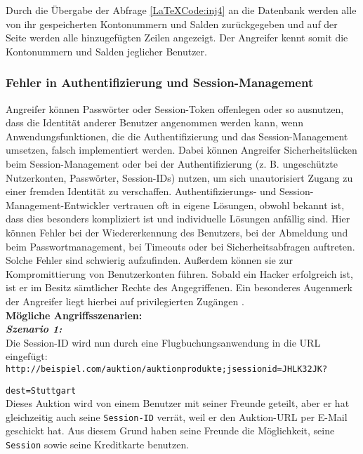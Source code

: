 Durch die Übergabe der Abfrage \ref{LaTeXCode:inj4} an die Datenbank werden alle von ihr gespeicherten Kontonummern und Salden zurückgegeben und auf der Seite werden alle hinzugefügten Zeilen angezeigt. Der Angreifer kennt somit die Kontonummern und Salden jeglicher Benutzer.

\subsubsection{Fehler in Authentifizierung und Session-Management}

Angreifer können Passwörter oder Session-Token offenlegen oder so ausnutzen, dass die Identität anderer Benutzer angenommen werden kann, wenn Anwendungsfunktionen, die die Authentifizierung und das Session-Management umsetzen, falsch implementiert werden. Dabei können Angreifer Sicherheitslücken beim Session-Management oder bei der Authentifizierung (z. B. ungeschützte Nutzerkonten, Passwörter, Session-IDs) nutzen, um sich unautorisiert Zugang zu einer fremden Identität zu verschaffen. Authentifizierungs- und Session-Management-Entwickler vertrauen oft in eigene Lösungen, obwohl bekannt ist, dass dies besonders kompliziert ist und individuelle Lösungen anfällig sind. Hier können Fehler bei der Wiedererkennung des Benutzers, bei der Abmeldung und beim Passwortmanagement, bei Timeouts oder bei Sicherheitsabfragen auftreten. Solche Fehler sind schwierig aufzufinden. Außerdem können sie zur Kompromittierung von Benutzerkonten führen. Sobald ein Hacker erfolgreich ist, ist er im Besitz sämtlicher Rechte des Angegriffenen. Ein besonderes Augenmerk der Angreifer liegt hierbei auf privilegierten Zugängen \cite{owasp13top10}.\\

\textbf{Mögliche Angriffsszenarien:}\\

\textbf{\textit{Szenario 1:}}\\
Die Session-ID wird nun durch eine Flugbuchungsanwendung   in die URL eingefügt\cite{owasp13top10}:\\

\texttt{http://beispiel.com/auktion/auktionprodukte;jsessionid=JHLK32JK?}

\texttt{dest=Stuttgart}\\

Dieses Auktion wird von einem Benutzer mit seiner Freunde geteilt, aber er hat gleichzeitig auch seine \texttt{Session-ID} verrät, weil er den Auktion-URL per E-Mail geschickt hat. Aus diesem Grund  haben seine Freunde die Möglichkeit, seine \texttt{Session} sowie seine Kreditkarte benutzen.\\

